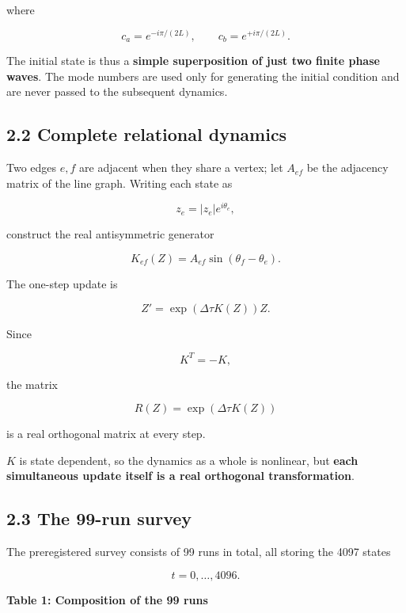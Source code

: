 \documentclass[
  a4paper,
]{article}
\begin{document}
where

\[
c_a=e^{-i\pi/(2L)},
\qquad
c_b=e^{+i\pi/(2L)}.
\]

The initial state is thus a \textbf{simple superposition of just two
finite phase waves}. The mode numbers are used only for generating the
initial condition and are never passed to the subsequent dynamics.

\subsection{2.2 Complete relational
dynamics}\label{complete-relational-dynamics}

Two edges \(e,f\) are adjacent when they share a vertex; let \(A_{ef}\)
be the adjacency matrix of the line graph. Writing each state as

\[
z_e=|z_e|e^{i\theta_e},
\]

construct the real antisymmetric generator

\[
K_{ef}(Z)
=
A_{ef}\sin(\theta_f-\theta_e).
\]

The one-step update is

\[
\boxed{
Z'=\exp(\Delta\tau K(Z))Z
}.
\]

Since

\[
K^T=-K,
\]

the matrix

\[
R(Z)=\exp(\Delta\tau K(Z))
\]

is a real orthogonal matrix at every step.

\(K\) is state dependent, so the dynamics as a whole is nonlinear, but
\textbf{each simultaneous update itself is a real orthogonal
transformation}.

\subsection{2.3 The 99-run survey}\label{the-99-run-survey}

The preregistered survey consists of 99 runs in total, all storing the
4097 states

\[
t=0,\ldots,4096.
\]

\textbf{Table 1: Composition of the 99 runs}
\end{document}
